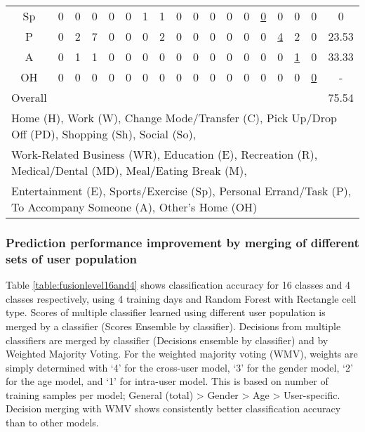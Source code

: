 \documentclass{sig-alternate}
\begin{document}
\begin{table*}[ htb]
\begin{tabular}{c| c c c c c c c c c c c c c c c c c }
Sp	&0	&0	&0&	0&	0&	1&	1&	0&	0&	0&	0	&0	&\underline{0}	&0	&0	&0	&0\\
P	&0	&2	&7&	0&	0&	0&	2&	0&	0&	0&	0	&0	&0	&\underline{4}	&2	&0	& 23.53\\
A	&0	&1	&1&	0&	0&	0&	0&	0&	0&	0&	0	&0	&0	&0	&\underline{1}	&0	& 33.33\\
OH	&0	&0	&0&	0&	0&	0&	0&	0&	0&	0&	0	&0	&0	&0	&0	&\underline{0}	& - \\
\hline
Overall & & & & & & & & & & & & & & & & &    75.54 \\
\bottomrule
\multicolumn{18}{l}{Home (H), Work (W), Change Mode/Transfer (C), Pick Up/Drop Off (PD), Shopping (Sh), Social (So),  }\\
\multicolumn{18}{l}{Work-Related Business (WR), Education (E), Recreation (R), Medical/Dental (MD), Meal/Eating Break (M), }\\
\multicolumn{18}{l}{Entertainment (E), Sports/Exercise (Sp), Personal Errand/Task (P), To Accompany Someone (A), Other's Home (OH)}\\
 \end{tabular}\label{table:confusion}
\end{table*}



\subsubsection{Prediction performance improvement by merging of different sets of user population }
Table \ref{table:fusionlevel16and4} shows classification accuracy for 16 classes and 4 classes respectively, using 4 training days and Random Forest with Rectangle cell type. Scores of multiple classifier learned using different user population is merged by a classifier (Scores Ensemble by classifier). Decisions from multiple classifiers are merged by classifier (Decisions ensemble by classifier) and by Weighted Majority Voting. For the weighted majority voting (WMV), weights are simply determined with `4' for the cross-user model, `3' for the gender model, `2' for the age model, and `1' for intra-user model. This is based on number of training samples per model; General (total) > Gender > Age > User-specific. Decision merging with WMV shows consistently better classification accuracy than to other models.
 	
\end{document}
